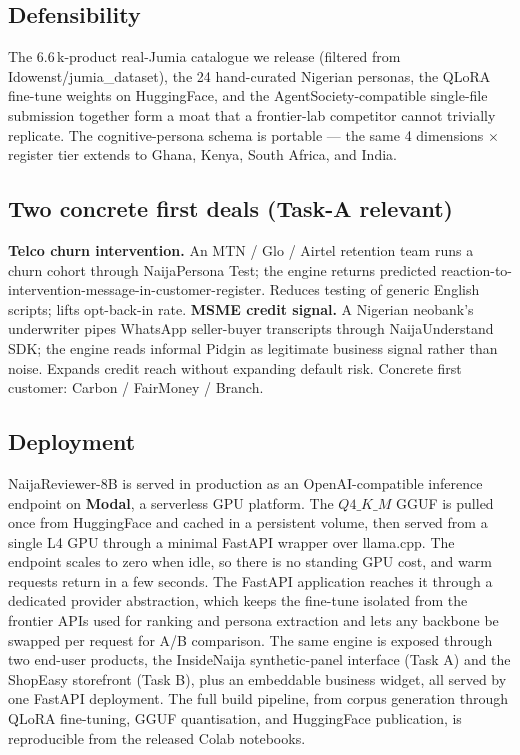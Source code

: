 \documentclass[sigconf,nonacm,balance]{acmart}
\begin{document}
\subsection*{Defensibility}
The 6.6\,k-product real-Jumia catalogue we release (filtered from
\textsf{Idowenst/jumia\_dataset}), the 24 hand-curated Nigerian personas,
the QLoRA fine-tune weights on HuggingFace, and the AgentSociety-compatible
single-file submission together form a moat that a frontier-lab competitor
cannot trivially replicate. The cognitive-persona schema is portable ---
the same 4 dimensions $\times$ register tier extends to Ghana, Kenya,
South Africa, and India.

\subsection*{Two concrete first deals (Task-A relevant)}
\textbf{Telco churn intervention.} An MTN / Glo / Airtel retention team
runs a churn cohort through NaijaPersona Test; the engine returns
predicted reaction-to-intervention-message-in-customer-register.
Reduces testing of generic English scripts; lifts opt-back-in rate.
\textbf{MSME credit signal.} A Nigerian neobank's underwriter pipes
WhatsApp seller-buyer transcripts through NaijaUnderstand SDK; the
engine reads informal Pidgin as legitimate business signal rather than
noise. Expands credit reach without expanding default risk. Concrete
first customer: Carbon / FairMoney / Branch.

\subsection{Deployment}
\label{sec:deploy}
NaijaReviewer-8B is served in production as an OpenAI-compatible inference
endpoint on \textbf{Modal}, a serverless GPU platform. The $Q4\_K\_M$ GGUF is
pulled once from HuggingFace and cached in a persistent volume, then served
from a single L4 GPU through a minimal FastAPI wrapper over
\textsf{llama.cpp}. The endpoint scales to zero when idle, so there is no
standing GPU cost, and warm requests return in a few seconds. The FastAPI
application reaches it through a dedicated provider abstraction, which keeps
the fine-tune isolated from the frontier APIs used for ranking and persona
extraction and lets any backbone be swapped per request for A/B comparison.
The same engine is exposed through two end-user products, the InsideNaija
synthetic-panel interface (Task A) and the ShopEasy storefront (Task B), plus
an embeddable business widget, all served by one FastAPI deployment. The full
build pipeline, from corpus generation through QLoRA fine-tuning, GGUF
quantisation, and HuggingFace publication, is reproducible from the released
Colab notebooks.
\end{document}
